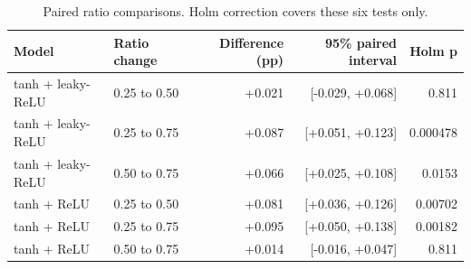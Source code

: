 \begin{table}[htbp]
\centering
\caption{Paired ratio comparisons. Holm correction covers these six tests only.}
\label{tab:ratiopairs}
\footnotesize
\begin{tabular}{@{}llrrr@{}}
\toprule
Model & Ratio change & Difference (pp) & 95\% paired interval & Holm p \\
\midrule
tanh + leaky-ReLU & 0.25 to 0.50 & +0.021 & [-0.029, +0.068] & 0.811 \\
tanh + leaky-ReLU & 0.25 to 0.75 & +0.087 & [+0.051, +0.123] & 0.000478 \\
tanh + leaky-ReLU & 0.50 to 0.75 & +0.066 & [+0.025, +0.108] & 0.0153 \\
tanh + ReLU & 0.25 to 0.50 & +0.081 & [+0.036, +0.126] & 0.00702 \\
tanh + ReLU & 0.25 to 0.75 & +0.095 & [+0.050, +0.138] & 0.00182 \\
tanh + ReLU & 0.50 to 0.75 & +0.014 & [-0.016, +0.047] & 0.811 \\
\bottomrule
\end{tabular}
\end{table}
